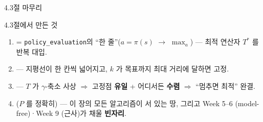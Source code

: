\begin{frame}{4.3절 마무리}
  \begin{block}{4.3절에서 만든 것}
    \begin{enumerate}
      \item {} = \texttt{policy\_evaluation}의
        ``한 줄''($a = \pi(s)$ $\to$ $\max_a$) --- 최적
        연산자 $T^{*}$ 를 반복 대입.
      \item {} ---
        지평선이 한 칸씩 넓어지고, $k$ 가 목표까지 최대
        거리에 달하면 고정.
      \item {} --- $T$ 가 $\gamma$-축소
        사상 $\Rightarrow$ 고정점 \textbf{유일} + 어디서든
        \textbf{수렴} $\Rightarrow$ ``멈추면 최적'' 완결.
      \item {}($P$ 를 정확히) --- 이 장의
        모든 알고리즘이 서 있는 땅, 그리고 Week 5--6
        (model-free)·Week 9 (근사)가 채울 \textbf{빈자리}.
    \end{enumerate}
  \end{block}
\end{frame}
